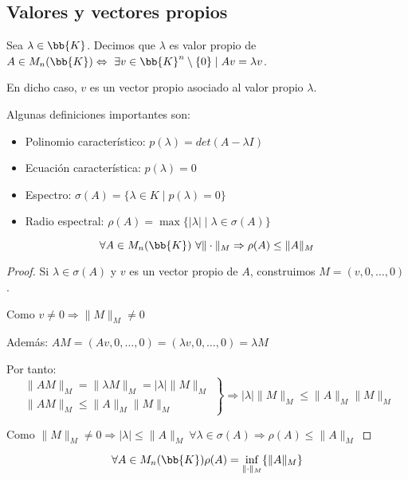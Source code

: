 \subsection{Valores y vectores propios}
\begin{definicion}
    Sea $\lambda \in \bb{K}$. Decimos que $\lambda$ es valor propio de $A \in M_n(\bb{K}) \Leftrightarrow \ \exists v \in \bb{K}^n \setminus \{0\} \mid Av=\lambda v$.

    En dicho caso, $v$ es un vector propio asociado al valor propio $\lambda$.
\end{definicion}

Algunas definiciones importantes son:
\begin{itemize}
    \item Polinomio característico: $p(\lambda)=det(A - \lambda I)$
    \item Ecuación característica: $p(\lambda)=0$
    \item Espectro: $\sigma(A)=\{\lambda \in K \mid p(\lambda)=0\}$
    \item Radio espectral: $\rho(A) = \max\{|\lambda| \mid \lambda \in \sigma(A)\}$
\end{itemize}

\begin{prop}
    $$\forall A \in M_n(\bb{K}) \ \forall \|\cdot\|_M \Rightarrow \rho(A)\leq \|A\|_M$$
\end{prop}
\begin{proof}
    Si $\lambda \in \sigma(A)$ y $v$ es un vector propio de $A$, construimos $M=(v, 0, \ldots, 0)$.

    Como $v\neq 0 \Rightarrow \|M\|_M \neq 0$

    Además: $AM = (Av, 0, \ldots, 0) = (\lambda v, 0, \ldots, 0) = \lambda M$

    Por tanto:
    $$\left.\begin{array}{l}
            \|AM\|_M = \|\lambda M\|_M = |\lambda|\|M\|_M \\
            \|AM\|_M \leq \|A\|_M \|M\|_M
        \end{array}\right\} \Rightarrow |\lambda|\|M\|_M \leq \|A\|_M \|M\|_M$$

    Como $\|M\|_M \neq 0 \Rightarrow |\lambda|\leq \|A\|_M \ \forall \lambda \in \sigma(A) \Rightarrow \rho(A) \leq \|A\|_M$
\end{proof}

\begin{prop}
    $$\forall A \in M_n(\bb{K}) \rho(A) = \inf_{\|\cdot\|_M}\{\|A\|_M\}$$
\end{prop}

